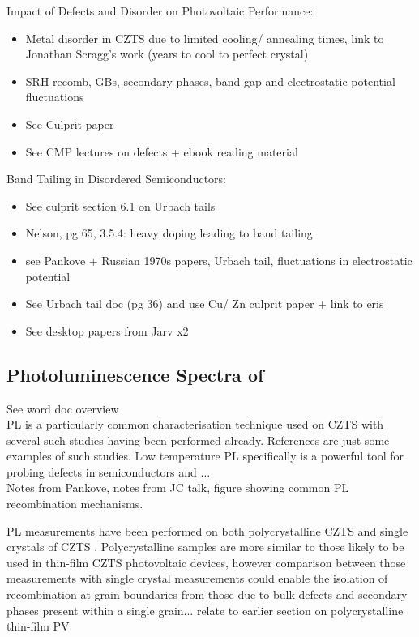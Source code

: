 Impact of Defects and Disorder on Photovoltaic Performance:
\begin{itemize}
\item Metal disorder in CZTS due to limited cooling/ annealing times, link to Jonathan Scragg's work (years to cool to perfect crystal)
\item SRH recomb, GBs, secondary phases, band gap and electrostatic potential fluctuations
\item See Culprit paper
\item See CMP lectures on defects + ebook reading material 
\end{itemize}

Band Tailing in Disordered Semiconductors:
\begin{itemize}
\item See culprit section 6.1 on Urbach tails
\item Nelson, pg 65, 3.5.4: heavy doping leading to band tailing
\item see Pankove + Russian 1970s papers, Urbach tail, fluctuations in electrostatic potential
\item See Urbach tail doc (pg 36) and use Cu/ Zn culprit paper + link to eris
\item See desktop papers from Jarv x2
\end{itemize}




\subsection{Photoluminescence Spectra of \CZTS}\label{CZTS_PL_section}
See word doc overview\\

PL is a particularly common characterisation technique used on CZTS with several such studies having been performed already. References  are just some examples of such studies. Low temperature PL specifically is a powerful tool for probing defects in semiconductors \cite{Gershon1} and ...\\
Notes from Pankove, notes from JC talk, figure showing common PL recombination mechanisms.

PL measurements have been performed on both polycrystalline CZTS \cite{Romero, Miyamoto, Unold} and single crystals of CZTS \cite{Halliday, Levcenko, Hones}. Polycrystalline samples are more similar to those likely to be used in thin-film CZTS photovoltaic devices, however comparison between those measurements with single crystal measurements could enable the isolation of recombination at grain boundaries from those due to bulk defects and secondary phases present within a single grain... relate to earlier section on polycrystalline thin-film PV\\

